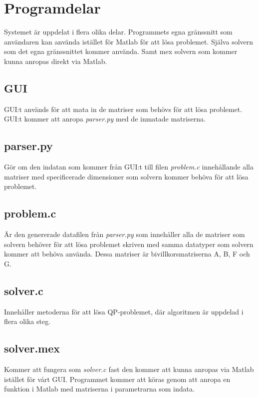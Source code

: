 \section{Programdelar}
Systemet är uppdelat i flera olika delar. Programmets egna gränssnitt som användaren kan använda istället för Matlab för att lösa problemet. Själva solvern som det egna gränssnittet kommer använda. Samt mex solvern som kommer kunna anropas direkt via Matlab.

\subsection{GUI}
GUI:t används för att mata in de matriser som behövs för att lösa problemet. GUI:t kommer att anropa \textit{parser.py} med de inmatade matriserna.

\subsection{parser.py}
Gör om den indatan som kommer från GUI:t till filen \textit{problem.c} innehållande alla matriser med specificerade dimensioner som solvern kommer behöva för att lösa problemet.

\subsection{problem.c}
Är den genererade datafilen från \textit{parser.py} som innehåller alla de matriser som solvern behöver för att lösa problemet skriven med samma datatyper som solvern kommer att behöva använda. Dessa matriser är bivillkorsmatriserna A, B, F och G.  

\subsection{solver.c}
Innehåller metoderna för att lösa QP-problemet, där algoritmen är uppdelad i flera olika steg.

\subsection{solver.mex}
Kommer att fungera som \textit{solver.c} fast den kommer att kunna anropas via Matlab istället för vårt GUI. Programmet kommer att köras genom att anropa en funktion i Matlab med matriserna i parametrarna som indata.